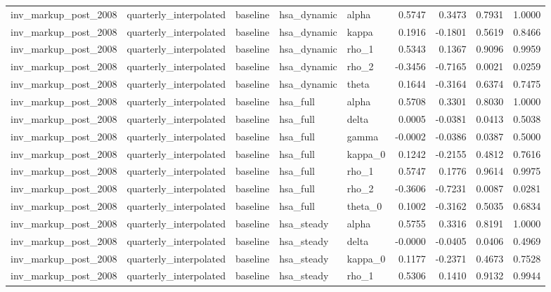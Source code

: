 \begin{tabular}{lllllrrrr}
inv\_markup\_post\_2008 & quarterly\_interpolated & baseline & hsa\_dynamic & alpha & 0.5747 & 0.3473 & 0.7931 & 1.0000 \\
inv\_markup\_post\_2008 & quarterly\_interpolated & baseline & hsa\_dynamic & kappa & 0.1916 & -0.1801 & 0.5619 & 0.8466 \\
inv\_markup\_post\_2008 & quarterly\_interpolated & baseline & hsa\_dynamic & rho\_1 & 0.5343 & 0.1367 & 0.9096 & 0.9959 \\
inv\_markup\_post\_2008 & quarterly\_interpolated & baseline & hsa\_dynamic & rho\_2 & -0.3456 & -0.7165 & 0.0021 & 0.0259 \\
inv\_markup\_post\_2008 & quarterly\_interpolated & baseline & hsa\_dynamic & theta & 0.1644 & -0.3164 & 0.6374 & 0.7475 \\
inv\_markup\_post\_2008 & quarterly\_interpolated & baseline & hsa\_full & alpha & 0.5708 & 0.3301 & 0.8030 & 1.0000 \\
inv\_markup\_post\_2008 & quarterly\_interpolated & baseline & hsa\_full & delta & 0.0005 & -0.0381 & 0.0413 & 0.5038 \\
inv\_markup\_post\_2008 & quarterly\_interpolated & baseline & hsa\_full & gamma & -0.0002 & -0.0386 & 0.0387 & 0.5000 \\
inv\_markup\_post\_2008 & quarterly\_interpolated & baseline & hsa\_full & kappa\_0 & 0.1242 & -0.2155 & 0.4812 & 0.7616 \\
inv\_markup\_post\_2008 & quarterly\_interpolated & baseline & hsa\_full & rho\_1 & 0.5747 & 0.1776 & 0.9614 & 0.9975 \\
inv\_markup\_post\_2008 & quarterly\_interpolated & baseline & hsa\_full & rho\_2 & -0.3606 & -0.7231 & 0.0087 & 0.0281 \\
inv\_markup\_post\_2008 & quarterly\_interpolated & baseline & hsa\_full & theta\_0 & 0.1002 & -0.3162 & 0.5035 & 0.6834 \\
inv\_markup\_post\_2008 & quarterly\_interpolated & baseline & hsa\_steady & alpha & 0.5755 & 0.3316 & 0.8191 & 1.0000 \\
inv\_markup\_post\_2008 & quarterly\_interpolated & baseline & hsa\_steady & delta & -0.0000 & -0.0405 & 0.0406 & 0.4969 \\
inv\_markup\_post\_2008 & quarterly\_interpolated & baseline & hsa\_steady & kappa\_0 & 0.1177 & -0.2371 & 0.4673 & 0.7528 \\
inv\_markup\_post\_2008 & quarterly\_interpolated & baseline & hsa\_steady & rho\_1 & 0.5306 & 0.1410 & 0.9132 & 0.9944 \\

\end{tabular}
